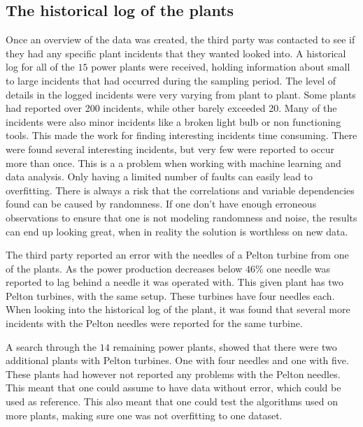     \subsection{The historical log of the plants }
        Once an overview of the data was created, the third party was contacted to see if they had any specific plant incidents that they wanted looked into. A historical log for all of the $15$ power plants were received, holding information about small to large incidents that had occurred during the sampling period. The level of details in the logged incidents were very varying from plant to plant. Some plants had reported over 200 incidents, while other barely exceeded 20. Many of the incidents were also minor incidents like a broken light bulb or non functioning tools. This made the work for finding interesting incidents time consuming. There were found several interesting incidents, but very few were reported to occur more than once. This is a a problem when working with machine learning and data analysis. Only having a limited number of faults can easily lead to overfitting. There is always a risk that the correlations and variable dependencies found can be caused by randomness. If one don't have enough erroneous observations to ensure that one is not modeling randomness and noise, the results can end up looking great, when in reality the solution is worthless on new data. 
        
        The third party reported an error with the needles of a Pelton turbine from one of the plants. As the power production decreases below $46\%$ one needle was reported to lag behind a needle it was operated with. This given plant has two Pelton turbines, with the same setup. These turbines have four needles each. When looking into the historical log of the plant, it was found that several more incidents with the Pelton needles were reported for the same turbine.
        
        A search through the $14$ remaining power plants, showed that there were two additional plants with Pelton turbines. One with four needles and one with five. These plants had however not reported any problems with the Pelton needles. This meant that one could assume to have data without error, which could be used as reference. This also meant that one could test the algorithms used on more plants, making sure one was not overfitting to one dataset. 
        
        
        
